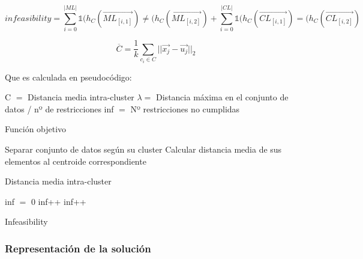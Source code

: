 \begin{equation}
    infeasibility = \sum_{i=0}^{|ML|} \mathds{1}(h_{C}(\overrightarrow{ML_{[i,1]}}) \neq (h_{C}(\overrightarrow{ML_{[i,2]}}) + \sum_{i=0}^{|CL|} \mathds{1}(h_{C}(\overrightarrow{CL_{[i,1]}}) = (h_{C}(\overrightarrow{CL_{[i,2]}})
\end{equation}

\begin{equation}
    \overline{C} = \frac{1}{k} \sum_{c_{i}\in C} || \overrightarrow{x_j} - \overrightarrow{u_j} ||_{2}
\end{equation}

Que es calculada en pseudocódigo: \\

\begin{algorithm}[H]
    \SetAlgoLined
        C $=$ Distancia media intra-cluster \;
        $\lambda =$ Distancia máxima en el conjunto de datos / nº de restricciones  \;
        inf $=$ Nº restricciones no cumplidas \;
    \caption{Función objetivo}
\end{algorithm}

\vspace{\baselineskip}

\begin{algorithm}[H]
    \SetAlgoLined
        Separar conjunto de datos según su cluster \;
         {
            Calcular distancia media de sus elementos al centroide correspondiente \;
        }        
    \caption{Distancia media intra-cluster}
\end{algorithm}

\vspace{\baselineskip}

\begin{algorithm}[H]
    \SetAlgoLined
        inf $=$ 0 \;
         {
             {
                inf++ \;
            }            
             {
                    inf++ \;
            }
        }
    \caption{Infeasibility}
\end{algorithm}

\subsubsection{Representación de la solución}

